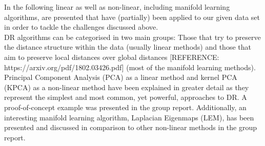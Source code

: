 \documentclass[journal, a4paper]{IEEEtran}
\begin{document}

%



In the following linear as well as non-linear, including manifold learning algorithms, are presented that have (partially) been applied to our given data set in order to tackle the challenges discussed above.\\

DR algorithms can be categorised in two main groups: Those that try to preserve the distance structure within the data (usually linear methods) and those that aim to preserve local distances over global distances [REFERENCE: https://arxiv.org/pdf/1802.03426.pdf] (most of the manifold learning methods).\\


Principal Component Analysis (PCA) as a linear method and kernel PCA (KPCA) as a non-linear method have been explained in greater detail as they represent the simplest and most common, yet powerful, approaches to DR. A proof-of-concept example was presented in the group report.
Additionally, an interesting manifold learning algorithm, Laplacian Eigenmaps (LEM), has been presented and discussed in comparison to other non-linear methods in the group report.
\end{document}
